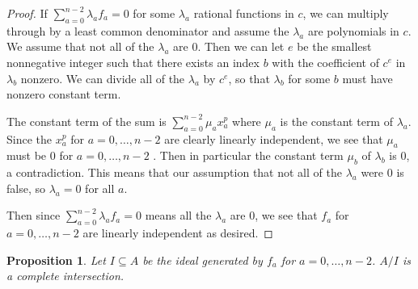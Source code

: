 \documentclass{article}
\numberwithin{equation}{section}
\newtheorem{proposition}[equation]{Proposition}
\begin{document}
\begin{proof}
If $\sum_{a=0}^{n-2} \lambda_af_a=0$ for some $\lambda_a$ rational functions in $c$, we can multiply through by a least common denominator and assume the $\lambda_a$ are polynomials in $c$. We assume that not all of the $\lambda_a$ are $0$. Then we can let $e$ be the smallest nonnegative integer such that there exists an index $b$ with the coefficient of $c^e$ in $\lambda_b$ nonzero. We can divide all of the $\lambda_a$ by $c^e$, so that $\lambda_b$ for some $b$ must have nonzero constant term.

The constant term of the sum is $\sum_{a=0}^{n-2}\mu_ax_a^p$ where $\mu_a$ is the constant term of $\lambda_a$. Since the $x_a^p$ for $a=0,\dots,n-2$ are clearly linearly independent, we see that $\mu_a$ must be $0$ for $a=0,\dots,n-2$ . Then in particular the constant term $\mu_b$ of $\lambda_b$ is $0$, a contradiction. This means that our assumption that not all of the $\lambda_a$ were $0$ is false, so $\lambda_a=0$ for all $a$. 

Then since $\sum_{a=0}^{n-2} \lambda_af_a=0$ means all the $\lambda_a$ are $0$, we see that $f_a$ for $a=0,\dots,n-2$ are linearly independent as desired. 

\end{proof}


\begin{proposition}\label{prop:ci} Let $I \subseteq A$ be the ideal generated by $f_a$ for $a=0,\dots,n-2$. $A/I$ is a complete intersection. 
\end{proposition}
\end{document}
